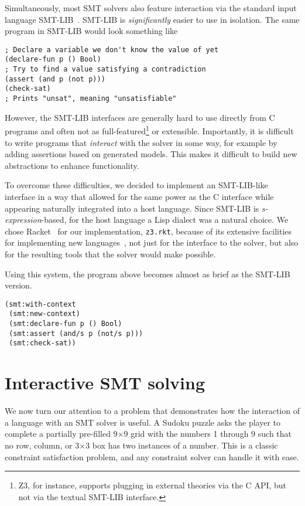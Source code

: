 Simultaneously, most SMT solvers also feature interaction via the standard input
language SMT-LIB~\cite{smtlib2:10}. SMT-LIB is \textit{significantly} easier to
use in isolation. The same program in SMT-LIB would look something like

\begin{verbatim}
; Declare a variable we don't know the value of yet
(declare-fun p () Bool)
; Try to find a value satisfying a contradiction
(assert (and p (not p)))
(check-sat)
; Prints "unsat", meaning "unsatisfiable"
\end{verbatim}

However, the SMT-LIB interfaces are generally hard to use directly from C
programs and often not as full-featured\footnote{Z3, for instance, supports
plugging in external theories via the C API, but not via the textual SMT-LIB
interface.}  or extensible. Importantly, it is difficult to write programs
that \textit{interact} with the solver in some way, for example by adding
assertions based on generated models. This makes it difficult to build new
abstractions to enhance functionality.

To overcome these difficulties, we decided to implement an SMT-LIB-like
interface in a way that allowed for the same power as the C interface while
appearing naturally integrated into a host language. Since SMT-LIB is {\em
s-expression}-based, for the host language a Lisp dialect was a natural
choice. We chose Racket~\cite{racket} for our implementation, \texttt{z3.rkt},
because of its extensive facilities for implementing new languages~\cite
{Tobin-Hochstadt:11}, not just for the interface to the solver, but also for
the resulting tools that the solver would make possible.

Using this system, the program above becomes almost as brief as the SMT-LIB
version.

\begin{verbatim}
(smt:with-context
 (smt:new-context)
 (smt:declare-fun p () Bool)
 (smt:assert (and/s p (not/s p)))
 (smt:check-sat))
\end{verbatim}

\section{Interactive SMT solving}
\label{sec:interactive}

We now turn our attention to a problem that demonstrates how the interaction of
a language with an SMT solver is useful. A Sudoku puzzle asks the player to
complete a partially pre-filled 9$\times$9 grid with the numbers 1 through 9
such that no row, column, or 3$\times$3 box has two instances of a number. This
is a classic constraint satisfaction problem, and any constraint solver can
handle it with ease.

